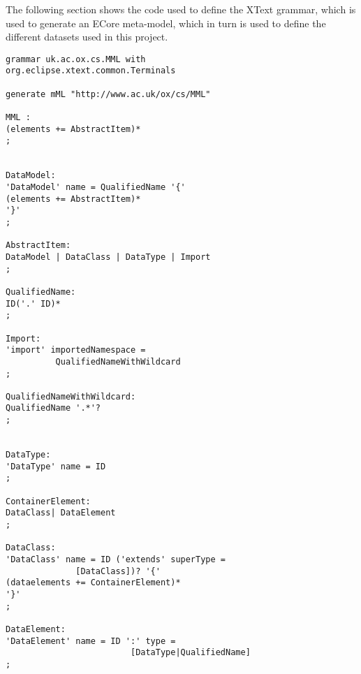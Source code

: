 \documentclass[a4paper,twoside]{article}
\begin{document}
The following section shows the code used to define the XText grammar, which is used to generate an ECore meta-model, which in turn is used to define the different datasets used in this project.
\begin{small}
	\begin{verbatim}
grammar uk.ac.ox.cs.MML with 
org.eclipse.xtext.common.Terminals

generate mML "http://www.ac.uk/ox/cs/MML"

MML :
(elements += AbstractItem)*
;


DataModel:
'DataModel' name = QualifiedName '{'
(elements += AbstractItem)*
'}'
;

AbstractItem:
DataModel | DataClass | DataType | Import
;

QualifiedName:
ID('.' ID)*
;

Import:
'import' importedNamespace = 
          QualifiedNameWithWildcard
;

QualifiedNameWithWildcard:
QualifiedName '.*'?
;


DataType:
'DataType' name = ID
;

ContainerElement:
DataClass| DataElement
;

DataClass:
'DataClass' name = ID ('extends' superType =
              [DataClass])? '{'
(dataelements += ContainerElement)*
'}'
;

DataElement:
'DataElement' name = ID ':' type =  
                         [DataType|QualifiedName]
;
	\end{verbatim}
\end{small}
\end{document}
